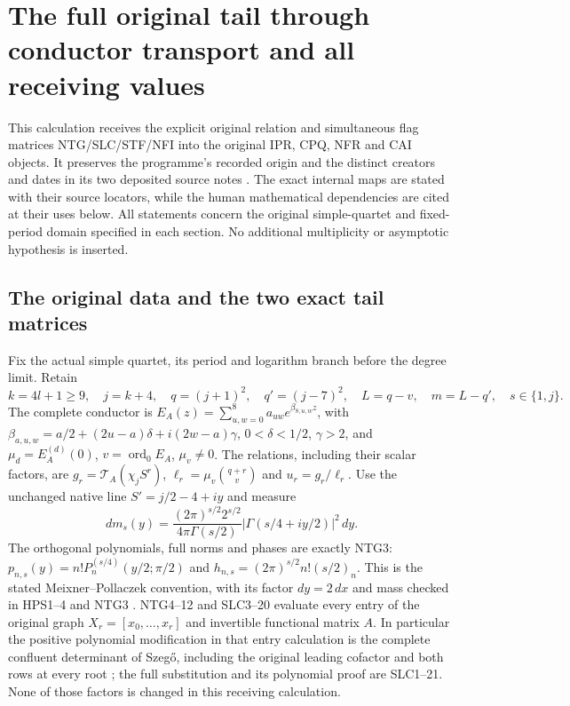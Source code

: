 \begingroup
\section{The full original tail through conductor transport and all receiving values}
\label{sec:FTR}
This calculation receives the explicit original relation and simultaneous
flag matrices NTG/SLC/STF/NFI into the original IPR, CPQ, NFR and CAI
objects. It preserves the programme's recorded origin and the distinct
creators and dates in its two deposited source notes
\cite{human:globalization2026,human:splitzero2026}.
The exact internal maps are stated with their source locators, while
the human mathematical dependencies are cited at their uses below.
All statements concern the original simple-quartet and fixed-period
domain specified in each section. No additional multiplicity or
asymptotic hypothesis is inserted.

\subsection{The original data and the two exact tail matrices}
Fix the actual simple quartet, its period and logarithm branch before
the degree limit. Retain
\[
 k=4l+1\ge9,\quad j=k+4,\quad q=(j+1)^2,\quad q'=(j-7)^2,
 \quad L=q-v,\quad m=L-q',\quad s\in\{1,j\}.                 \tag{FTR1}
\]
The complete conductor is
$E_A(z)=\sum_{u,w=0}^{8}a_{uw}e^{\beta_{8,u,w}z}$, with
$\beta_{a,u,w}=a/2+(2u-a)\delta+i(2w-a)\gamma$,
$0<\delta<1/2$, $\gamma>2$, and
$\mu_d=E_A^{(d)}(0)$, $v=\operatorname{ord}_0E_A$,
$\mu_v\ne0$. The relations, including their scalar factors, are
$g_r=\mathcal T_A(\chi_jS^r)$,
$\ell_r=\mu_v\binom{q+r}{v}$ and $u_r=g_r/\ell_r$.
Use the unchanged native line $S'=j/2-4+iy$ and measure
\[
 dm_s(y)=\frac{(2\pi)^{s/2}2^{s/2}}{4\pi\Gamma(s/2)}
             |\Gamma(s/4+iy/2)|^2\,dy .                  \tag{FTR2}
\]
The orthogonal polynomials, full norms and phases are exactly NTG3:
$p_{n,s}(y)=n!P_n^{(s/4)}(y/2;\pi/2)$ and
$h_{n,s}=(2\pi)^{s/2}n!(s/2)_n$. This is the stated
Meixner--Pollaczek convention, with its factor $dy=2\,dx$ and
mass checked in HPS1--4 and NTG3
\cite[eqs.~(18.19.8)--(18.19.9), (18.22.8)]{human:dlmf18}.
NTG4--12 and SLC3--20 evaluate every entry of the original graph
$X_r=[x_0,\ldots,x_r]$ and invertible functional matrix $A$.
In particular the positive polynomial modification in that entry
calculation is the complete confluent determinant of Szeg\H{o},
including the original leading cofactor and both rows at every root
\cite[Theorem 2.5, pp.~29--30]{human:szego1975}; the full substitution
and its polynomial proof are SLC1--21. None of those factors is changed
in this receiving calculation.

